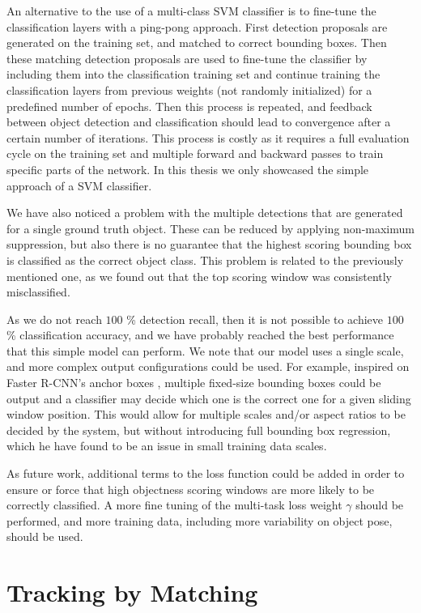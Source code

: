 An alternative to the use of a multi-class SVM classifier is to fine-tune the classification layers with a ping-pong approach. First detection proposals are generated on the training set, and matched to correct bounding boxes. Then these matching detection proposals are used to fine-tune the classifier by including them into the classification training set and continue training the classification layers from previous weights (not randomly initialized) for a predefined number of epochs. Then this process is repeated, and feedback between object detection and classification should lead to convergence after a certain number of iterations. This process is costly as it requires a full evaluation cycle on the training set and multiple forward and backward passes to train specific parts of the network. In this thesis we only showcased the simple approach of a SVM classifier.

We have also noticed a problem with the multiple detections that are generated for a single ground truth object. These can be reduced by applying non-maximum suppression, but also there is no guarantee that the highest scoring bounding box is classified as the correct object class. This problem is related to the previously mentioned one, as we found out that the top scoring window was consistently misclassified.

As we do not reach $100$ \% detection recall, then it is not possible to achieve $100$ \% classification accuracy, and we have probably reached the best performance that this simple model can perform. We note that our model uses a single scale, and more complex output configurations could be used. For example, inspired on Faster R-CNN's anchor boxes \cite{ren2015faster}, multiple fixed-size bounding boxes could be output and a classifier may decide which one is the correct one for a given sliding window position. This would allow for multiple scales and/or aspect ratios to be decided by the system, but without introducing full bounding box regression, which he have found to be an issue in small training data scales.

As future work, additional terms to the loss function could be added in order to ensure or force that high objectness scoring windows are more likely to be correctly classified. A more fine tuning of the multi-task loss weight $\gamma$ should be performed, and more training data, including more variability on object pose, should be used.

\FloatBarrier
\newpage
\section{Tracking by Matching}

